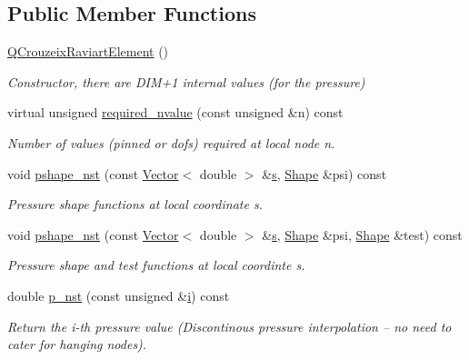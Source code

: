 \subsection*{Public Member Functions}
\begin{DoxyCompactItemize}
\item 
\hyperlink{classoomph_1_1QCrouzeixRaviartElement_a958e0749f4de49b210e17ad874f1ee2d}{Q\+Crouzeix\+Raviart\+Element} ()
\begin{DoxyCompactList}\small\item\em Constructor, there are D\+I\+M+1 internal values (for the pressure) \end{DoxyCompactList}\item 
virtual unsigned \hyperlink{classoomph_1_1QCrouzeixRaviartElement_a025946afee7e1ff977fb24569c438fd0}{required\+\_\+nvalue} (const unsigned \&n) const
\begin{DoxyCompactList}\small\item\em Number of values (pinned or dofs) required at local node n. \end{DoxyCompactList}\item 
void \hyperlink{classoomph_1_1QCrouzeixRaviartElement_a122c4b7ae47df08a07acd2f1ed6f61b0}{pshape\+\_\+nst} (const \hyperlink{classoomph_1_1Vector}{Vector}$<$ double $>$ \&\hyperlink{cfortran_8h_ab7123126e4885ef647dd9c6e3807a21c}{s}, \hyperlink{classoomph_1_1Shape}{Shape} \&psi) const
\begin{DoxyCompactList}\small\item\em Pressure shape functions at local coordinate s. \end{DoxyCompactList}\item 
void \hyperlink{classoomph_1_1QCrouzeixRaviartElement_a662b9593c9ca0b4589d5498812f1fb91}{pshape\+\_\+nst} (const \hyperlink{classoomph_1_1Vector}{Vector}$<$ double $>$ \&\hyperlink{cfortran_8h_ab7123126e4885ef647dd9c6e3807a21c}{s}, \hyperlink{classoomph_1_1Shape}{Shape} \&psi, \hyperlink{classoomph_1_1Shape}{Shape} \&test) const
\begin{DoxyCompactList}\small\item\em Pressure shape and test functions at local coordinte s. \end{DoxyCompactList}\item 
double \hyperlink{classoomph_1_1QCrouzeixRaviartElement_a3d3b2f685b66899fa0d56745bf5043d9}{p\+\_\+nst} (const unsigned \&\hyperlink{cfortran_8h_adb50e893b86b3e55e751a42eab3cba82}{i}) const
\begin{DoxyCompactList}\small\item\em Return the i-\/th pressure value (Discontinous pressure interpolation -- no need to cater for hanging nodes). \end{DoxyCompactList}\item 

\end{DoxyCompactItemize}

